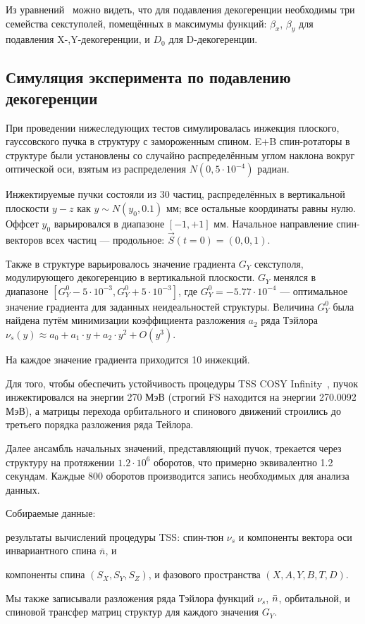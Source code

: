 Из уравнений~ можно
видеть, что для подавления декогеренции необходимы три семейства
секступолей, помещённых в максимумы функций: $\beta_x$, $\beta_y$ для подавления
X-,Y-декогеренции, и $D_0$ для D-декогеренции.

\subsection{Симуляция эксперимента по подавлению декогеренции}
При проведении нижеследующих тестов симулировалась инжекция
плоского, гауссовского пучка в структуру с замороженным
спином. E+B спин-ротаторы в структуре были установлены со случайно распределённым углом наклона вокруг оптической оси, взятым из распределения $N(0, 5\cdot10^{-4})$ радиан.

Инжектируемые пучки состояли из 30 частиц, распределённых в вертикальной
плоскости $y-z$ как $y\sim N(y_0, 0.1)$ мм; все остальные координаты равны нулю.
Оффсет $y_0$ варьировался в диапазоне $[-1, +1]$ мм. Начальное
направление спин-векторов всех частиц --- продольное: $\vec S(t=0) = (0,0,1)$.

Также в структуре варьировалось значение градиента $G_Y$ секступоля,
модулирующего декогеренцию в вертикальной плоскости. $G_Y$ менялся в
диапазоне $[G_Y^0 - 5\cdot10^{-3}, G_Y^0 + 5\cdot10^{-3}]$, где
$G_Y^0=-5.77\cdot 10^{-4}$ --- оптимальное значение градиента для заданных 
неидеальностей структуры. Величина $G_Y^0$ была найдена путём минимизации коэффициента разложения $a_2$
ряда Тэйлора $\nu_s(y) \approx a_0 + a_1\cdot y + a_2\cdot y^2 + O(y^3)$.

На каждое значение градиента приходится 10 инжекций.

Для того, чтобы обеспечить устойчивость процедуры TSS COSY Infinity~\cite{COSYINF:BeamPhysMan}, пучок инжектировался на энергии 270 МэВ (строгий FS находится на энергии 270.0092 МэВ), а матрицы перехода орбитального и спинового движений строились до третьего порядка разложения ряда Тейлора. 

Далее ансамбль начальных значений, представляющий пучок, трекается
через структуру на протяжении $1.2\cdot10^6$ оборотов, что
примерно эквивалентно 1.2 секундам. Каждые 800 оборотов производится
запись необходимых для анализа данных.

Собираемые данные: 
\begin{enumerate*}
	\item результаты вычислений процедуры TSS: спин-тюн $\nu_s$ и компоненты вектора оси инвариантного спина $\bar n$, и
	\item компоненты спина $(S_X, S_Y, S_Z)$, и фазового пространства $(X,A,Y,B,T,D)$.
\end{enumerate*}
Мы также записывали разложения ряда Тэйлора функций $\nu_s$, $\bar n$, орбитальной, и спиновой трансфер матриц
структур для каждого значения $G_Y$.

